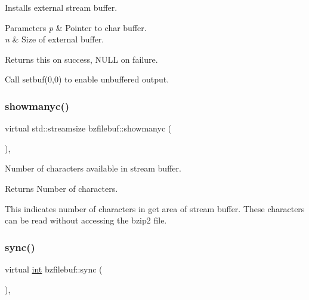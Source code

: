 Installs external stream buffer. 


\begin{DoxyParams}{Parameters}
{\em p} & Pointer to char buffer. \\
\hline
{\em n} & Size of external buffer. \\
\hline
\end{DoxyParams}
\begin{DoxyReturn}{Returns}
{\ttfamily this} on success, N\+U\+LL on failure.
\end{DoxyReturn}
Call setbuf(0,0) to enable unbuffered output. \mbox{\label{classbzfilebuf_aa21eab2632749a91a1d9a6e7af6bbe34}} 
\subsubsection{\texorpdfstring{showmanyc()}{showmanyc()}}
{\footnotesize\ttfamily virtual std\+::streamsize bzfilebuf\+::showmanyc (\begin{DoxyParamCaption}{ }\end{DoxyParamCaption})\hspace{0.3cm}{\ttfamily [protected]}, {\ttfamily [virtual]}}



Number of characters available in stream buffer. 

\begin{DoxyReturn}{Returns}
Number of characters.
\end{DoxyReturn}
This indicates number of characters in get area of stream buffer. These characters can be read without accessing the bzip2 file. \mbox{\label{classbzfilebuf_a75bcbd53c2acda4768c045777bc7baf2}} 
\subsubsection{\texorpdfstring{sync()}{sync()}}
{\footnotesize\ttfamily virtual \hyperlink{lp__lib_8h_adeb9ec6400320e4923ac9d836d509ddb}{int} bzfilebuf\+::sync (\begin{DoxyParamCaption}{ }\end{DoxyParamCaption})\hspace{0.3cm}{\ttfamily [protected]}, {\ttfamily [virtual]}}



